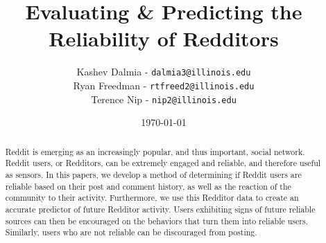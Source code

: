 \documentclass[a4paper]{article}
\title{Evaluating \& Predicting the Reliability of Redditors}
\author{Kashev Dalmia - \texttt{dalmia3@illinois.edu} \\
        Ryan Freedman - \texttt{rtfreed2@illinois.edu} \\
        Terence Nip - \texttt{nip2@illinois.edu}
        }
\date{\today}
\begin{document}
\maketitle

\begin{abstract}
Reddit is emerging as an increasingly popular, and thus important, social
network. Reddit users, or Redditors, can be extremely engaged and reliable, and
therefore useful as sensors. In this papers, we develop a method of determining
if Reddit users are reliable based on their post and comment history, as well as
the reaction of the community to their activity. Furthermore, we use this
Redditor data to create an accurate predictor of future Redditor activity. Users
exhibiting signs of future reliable sources can then be encouraged on the
behaviors that turn them into reliable users. Similarly, users who are not
reliable can be discouraged from posting.
\end{abstract}
\end{document}
